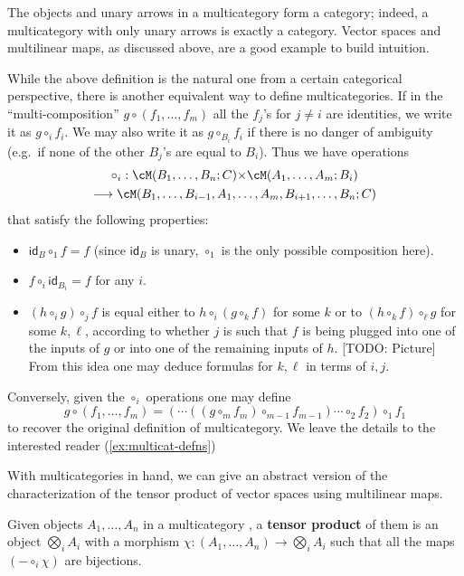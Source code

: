\documentclass{book}
\def\idfunc{\mathsf{id}}
\let\bigtensor\bigotimes
\begin{document}
The objects and unary arrows in a multicategory form a category; indeed, a multicategory with only unary arrows is exactly a category.
Vector spaces and multilinear maps, as discussed above, are a good example to build intuition.

While the above definition is the natural one from a certain categorical perspective, there is another equivalent way to define multicategories.
If in the ``multi-composition'' $g\circ (f_1,\dots,f_m)$ all the $f_j$'s for $j\neq i$ are identities, we write it as $g \circ_i f_i$.
We may also write it as $g\circ_{B_i} f_i$ if there is no danger of ambiguity (e.g.\ if none of the other $B_j$'s are equal to $B_i$).
Thus we have operations
\begin{multline*}
  \circ_i : \cM(B_1,\dots,B_n;C) \times \cM(A_1,\dots,A_m;B_i) \\
  \too \cM(B_1,\dots,B_{i-1},A_1,\dots,A_m,B_{i+1},\dots,B_n;C)
\end{multline*}
that satisfy the following properties:
\begin{itemize}
\item $\idfunc_B \circ_1 f = f$ (since $\idfunc_B$ is unary, $\circ_1$ is the only possible composition here).
\item $f\circ_i \idfunc_{B_i} = f$ for any $i$.
\item $(h \circ_i g) \circ_{j} f$ is equal either to $h\circ_i (g\circ_k f)$ for some $k$ or to $(h\circ_k f)\circ_\ell g$ for some $k,\ell$, according to whether $j$ is such that $f$ is being plugged into one of the inputs of $g$ or into one of the remaining inputs of $h$.
  [TODO: Picture]
  From this idea one may deduce formulas for $k,\ell$ in terms of $i,j$.
\end{itemize}
Conversely, given the $\circ_i$ operations one may define
\[ g\circ (f_1,\dots,f_m) = (\cdots((g \circ_m f_m) \circ_{m-1} f_{m-1}) \cdots \circ_2 f_2) \circ_1 f_1 \]
to recover the original definition of multicategory.
We leave the details to the interested reader (\cref{ex:multicat-defns})

With multicategories in hand, we can give an abstract version of the characterization of the tensor product of vector spaces using multilinear maps.
\begin{defn}
  Given objects $A_1,\dots,A_n$ in a multicategory \cM, a \textbf{tensor product} of them is an object $\bigtensor_i A_i$ with a morphism $\chi:(A_1,\dots,A_n) \to \bigtensor_i A_i$ such that all the maps $(-\circ_i \chi)$ are bijections.
\end{defn}
\end{document}
